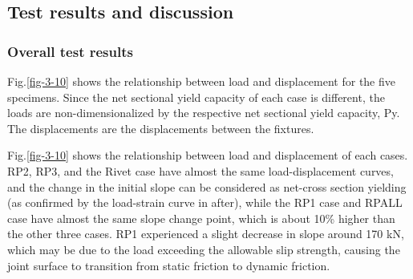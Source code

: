 \subsection{Test results and discussion}

\subsubsection{Overall test results}

Fig.\ref{fig-3-10} shows the relationship between load and displacement for the five specimens. Since the net sectional yield capacity of each case is different, the loads are non-dimensionalized by the respective net sectional yield capacity, Py. The displacements are the displacements between the fixtures.

Fig.\ref{fig-3-10} shows the relationship between load and displacement of each cases. RP2, RP3, and the Rivet case have almost the same load-displacement curves, and the change in the initial slope can be considered as net-cross section yielding (as confirmed by the load-strain curve in after), while the RP1 case and RPALL case have almost the same slope change point, which is about 10\% higher than the other three cases. RP1 experienced a slight decrease in slope around 170 kN, which may be due to the load exceeding the allowable slip strength, causing the joint surface to transition from static friction to dynamic friction.

